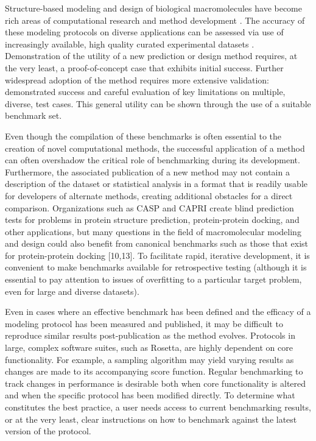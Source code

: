Structure-based modeling and design of biological macromolecules have become rich areas of computational research and method development \cite{leaver-fay_rosetta3:_2011,webb_comparative_2002,brooks_charmm:_2009,case_amber_200}. The accuracy of these modeling protocols on diverse applications can be assessed via use of increasingly available, high quality curated experimental datasets \cite{berman_protein_2000,kumar_protherm_2006,bento_chembl_2014,moal_skempi:_2012}. Demonstration of the utility of a new prediction or design method requires, at the very least, a proof-of-concept case that exhibits initial success. Further widespread adoption of the method requires more extensive validation: demonstrated success and careful evaluation of key limitations on multiple, diverse, test cases. This general utility can be shown through the use of a suitable benchmark set.

Even though the compilation of these benchmarks is often essential to the creation of novel computational methods, the successful application of a method can often overshadow the critical role of benchmarking during its development. Furthermore, the associated publication of a new method may not contain a description of the dataset or statistical analysis in a format that is readily usable for developers of alternate methods, creating additional obstacles for a direct comparison. Organizations such as CASP \cite{moult_critical_2014} and CAPRI \cite{janin_third_2007} create blind prediction tests for problems in protein structure prediction, protein-protein docking, and other applications, but many questions in the field of macromolecular modeling and design could also benefit from canonical benchmarks such as those that exist for protein-protein docking [10,13]. To facilitate rapid, iterative development, it is convenient to make benchmarks available for retrospective testing (although it is essential to pay attention to issues of overfitting to a particular target problem, even for large and diverse datasets).

Even in cases where an effective benchmark has been defined and the efficacy of a modeling protocol has been measured and published, it may be difficult to reproduce similar results post-publication as the method evolves. Protocols in large, complex software suites, such as Rosetta, are highly dependent on core functionality. For example, a sampling algorithm may yield varying results as changes are made to its accompanying score function. Regular benchmarking to track changes in performance is desirable both when core functionality is altered and when the specific protocol has been modified directly. To determine what constitutes the best practice, a user needs access to current benchmarking results, or at the very least, clear instructions on how to benchmark against the latest version of the protocol.

